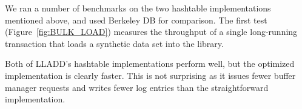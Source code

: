 \documentclass[10pt,letterpaper,twocolumn,english]{article}
\newcommand{\yad}{LLADD\xspace}
\newcommand{\eab}[1]{\textcolor{red}{\bf EAB: #1}}
\begin{document}
We ran a number of benchmarks on the two hashtable implementations
mentioned above, and used Berkeley DB for comparison.
The first test (Figure~\ref{fig:BULK_LOAD}) measures the throughput of
a single long-running
transaction that loads a synthetic data set into the
library. 

Both of \yad's hashtable implementations perform well, but the
optimized implementation is clearly faster.  This is not surprising as
it issues fewer buffer manager requests and writes fewer log entries
than the straightforward implementation.



\end{document}
